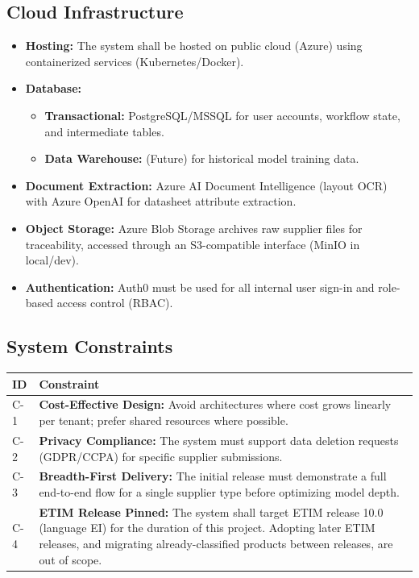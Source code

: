 \documentclass[12pt, a4paper]{article}
\begin{document}
\subsection{Cloud Infrastructure}
\begin{itemize}
    \item \textbf{Hosting:} The system shall be hosted on public cloud (Azure) using containerized services (Kubernetes/Docker).
    \item \textbf{Database:} 
    \begin{itemize}
        \item \textbf{Transactional:} PostgreSQL/MSSQL for user accounts, workflow state, and intermediate tables.
        \item \textbf{Data Warehouse:} (Future) for historical model training data.
    \end{itemize}
    \item \textbf{Document Extraction:} Azure AI Document Intelligence (layout OCR) with Azure OpenAI for datasheet attribute extraction.
    \item \textbf{Object Storage:} Azure Blob Storage archives raw supplier files for traceability, accessed through an S3-compatible interface (MinIO in local/dev).
    \item \textbf{Authentication:} Auth0 must be used for all internal user sign-in and role-based access control (RBAC).
\end{itemize}

\subsection{System Constraints}
\begin{tabular}{@{}l >{\raggedright\arraybackslash}p{12cm}@{}}
\toprule
\textbf{ID} & \textbf{Constraint} \\
\midrule
C-1 & \textbf{Cost-Effective Design:} Avoid architectures where cost grows linearly per tenant; prefer shared resources where possible. \\
\addlinespace
C-2 & \textbf{Privacy Compliance:} The system must support data deletion requests (GDPR/CCPA) for specific supplier submissions. \\
\addlinespace
C-3 & \textbf{Breadth-First Delivery:} The initial release must demonstrate a full end-to-end flow for a single supplier type before optimizing model depth. \\
\addlinespace
C-4 & \textbf{ETIM Release Pinned:} The system shall target ETIM release 10.0 (language EI) for the duration of this project. Adopting later ETIM releases, and migrating already-classified products between releases, are out of scope. \\
\bottomrule
\end{tabular}
\end{document}
